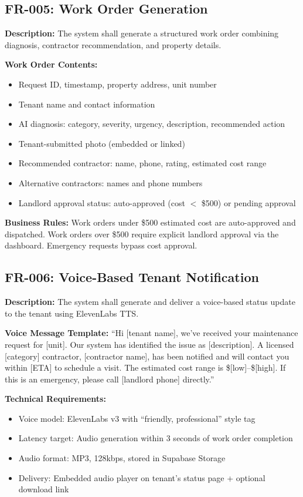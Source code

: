 \documentclass[12pt,a4paper]{article}
\begin{document}
\subsection{FR-005: Work Order Generation}

\textbf{Description:} The system shall generate a structured work order combining diagnosis, contractor recommendation, and property details.

\textbf{Work Order Contents:}

\begin{itemize}
    \item Request ID, timestamp, property address, unit number
    \item Tenant name and contact information
    \item AI diagnosis: category, severity, urgency, description, recommended action
    \item Tenant-submitted photo (embedded or linked)
    \item Recommended contractor: name, phone, rating, estimated cost range
    \item Alternative contractors: names and phone numbers
    \item Landlord approval status: auto-approved (cost $<$ \$500) or pending approval
\end{itemize}

\textbf{Business Rules:} Work orders under \$500 estimated cost are auto-approved and dispatched. Work orders over \$500 require explicit landlord approval via the dashboard. Emergency requests bypass cost approval.

\subsection{FR-006: Voice-Based Tenant Notification}

\textbf{Description:} The system shall generate and deliver a voice-based status update to the tenant using ElevenLabs TTS.

\textbf{Voice Message Template:} ``Hi [tenant name], we've received your maintenance request for [unit]. Our system has identified the issue as [description]. A licensed [category] contractor, [contractor name], has been notified and will contact you within [ETA] to schedule a visit. The estimated cost range is \$[low]--\$[high]. If this is an emergency, please call [landlord phone] directly.''

\textbf{Technical Requirements:}

\begin{itemize}
    \item Voice model: ElevenLabs v3 with ``friendly, professional'' style tag
    \item Latency target: Audio generation within 3 seconds of work order completion
    \item Audio format: MP3, 128kbps, stored in Supabase Storage
    \item Delivery: Embedded audio player on tenant's status page + optional download link
\end{itemize}
\end{document}
